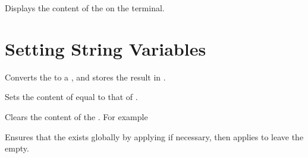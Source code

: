 \documentclass[oneside]{book}
\begin{document}
\begin{function}{\strVarShow}
\begin{syntax}
 
\end{syntax}
Displays the content of the  on the terminal.
\begin{codehigh}
\strSet {}
\strVarShow \lTmpiStr
\end{codehigh}
\end{function}

\section{Setting String Variables}

\begin{function}{\strSet}
\begin{syntax}
  
\end{syntax}
Converts the  to a , and stores the
result in .
\begin{demohigh}
\strSet {}
\strUse \lTmpiStr
\end{demohigh}
\end{function}

\begin{function}{\strSetEq}
\begin{syntax}
  
\end{syntax}
Sets the content of  equal to that of .
\begin{demohigh}
\strSet {}
\strSetEq \lTmpbStr \lTmpaStr
\strUse \lTmpbStr
\end{demohigh}
\end{function}

\begin{function}{\strClear}
\begin{syntax}
 
\end{syntax}
Clears the content of the . For example
\begin{demohigh}
\strSet {}
\strClear \lTmpjStr
\strSet {}
\strUse \lTmpjStr
\end{demohigh}
\end{function}

\begin{function}{\strClearNew}
\begin{syntax}
 
\end{syntax}
Ensures that the  exists globally by applying
 if necessary, then applies  to leave
the  empty.
\begin{codehigh}
\strClearNew \lFooSomeStr
\strUse \lFooSomeStr
\end{codehigh}
\end{function}
\end{document}

